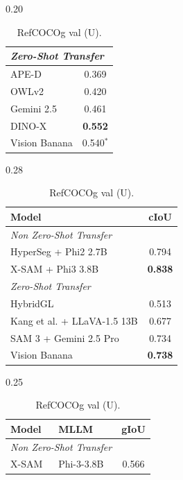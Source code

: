 \documentclass[11pt, a4paper, copyright, gdm]{google}
\begin{document}
\begin{table}[h]
\begin{subtable}[t]{0.20\textwidth}
\begin{tabular}[t]{@{}lc@{}}
        \midrule
        \multicolumn{2}{l}{\textit{Zero-Shot Transfer}} \\
        \midrule
        APE-D  & 0.369 \\
        OWLv2  & 0.420 \\
        Gemini 2.5  & 0.461 \\
        DINO-X & \textbf{\color{win_green} 0.552} \\
        Vision Banana & 0.540$^*$ \\
        \bottomrule
        \end{tabular}
        \caption{SA-Co/Gold.}
        \label{tab-seg-saco}
    \end{subtable}%
    \begin{subtable}[t]{0.28\textwidth}
        \scriptsize
        \begin{tabular}[t]{@{}lc@{}}
        \toprule
        Model & cIoU \\
        \midrule
        \multicolumn{2}{l}{\color{gray} \textit{Non Zero-Shot Transfer}} \\
        \midrule
        \color{gray}HyperSeg + Phi2 2.7B  & \color{gray}0.794 \\
        \color{gray}X-SAM + Phi3 3.8B  & \color{gray}\textbf{0.838} \\
        \midrule
        \multicolumn{2}{l}{\textit{Zero-Shot Transfer}} \\
        \midrule
        HybridGL & 0.513 \\
        Kang et al. + LLaVA-1.5 13B  & 0.677 \\
        SAM 3 + Gemini 2.5 Pro  & 0.734 \\
        Vision Banana  & \textbf{\color{win_green} 0.738} \\
        \bottomrule
        \end{tabular}
        \caption{RefCOCOg val (U).}
        \label{tab-seg-refcocog}
    \end{subtable}%
    \begin{subtable}[t]{0.25\textwidth}
        \centering
        \scriptsize
        \begin{tabular}[t]{@{}llc@{}}
        \toprule
        Model & MLLM & gIoU \\
        \midrule
        \multicolumn{2}{l}{\color{gray} \textit{Non Zero-Shot Transfer}} \\
        \midrule
        \color{gray} X-SAM & \color{gray} Phi-3-3.8B & \color{gray} 0.566 \\

\end{tabular}
\end{subtable}
\end{table}
\end{document}
